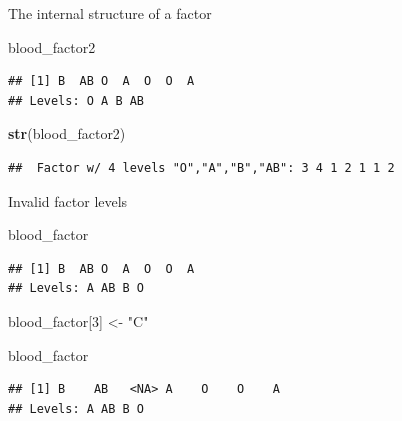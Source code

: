 \documentclass[ignorenonframetext,]{beamer}
\newenvironment{Shaded}{\begin{snugshade}}{\end{snugshade}}
\newcommand{\DecValTok}[1]{\textcolor[rgb]{0.00,0.00,0.81}{#1}}
\newcommand{\KeywordTok}[1]{\textcolor[rgb]{0.13,0.29,0.53}{\textbf{#1}}}
\newcommand{\NormalTok}[1]{#1}
\newcommand{\StringTok}[1]{\textcolor[rgb]{0.31,0.60,0.02}{#1}}
\begin{document}
\begin{frame}[fragile]{The internal structure of a factor}
\protect\hypertarget{the-internal-structure-of-a-factor-1}{}

\begin{Shaded}
\begin{Highlighting}[]
\NormalTok{blood_factor2}
\end{Highlighting}
\end{Shaded}

\begin{verbatim}
## [1] B  AB O  A  O  O  A 
## Levels: O A B AB
\end{verbatim}

\begin{Shaded}
\begin{Highlighting}[]
\KeywordTok{str}\NormalTok{(blood_factor2)}
\end{Highlighting}
\end{Shaded}

\begin{verbatim}
##  Factor w/ 4 levels "O","A","B","AB": 3 4 1 2 1 1 2
\end{verbatim}

\end{frame}

\begin{frame}[fragile]{Invalid factor levels}
\protect\hypertarget{invalid-factor-levels}{}

\begin{Shaded}
\begin{Highlighting}[]
\NormalTok{blood_factor}
\end{Highlighting}
\end{Shaded}

\begin{verbatim}
## [1] B  AB O  A  O  O  A 
## Levels: A AB B O
\end{verbatim}

\begin{Shaded}
\begin{Highlighting}[]
\NormalTok{blood_factor[}\DecValTok{3}\NormalTok{] <-}\StringTok{ "C"}
\end{Highlighting}
\end{Shaded}

\begin{Shaded}
\begin{Highlighting}[]
\NormalTok{blood_factor}
\end{Highlighting}
\end{Shaded}

\begin{verbatim}
## [1] B    AB   <NA> A    O    O    A   
## Levels: A AB B O
\end{verbatim}

\end{frame}
\end{document}
